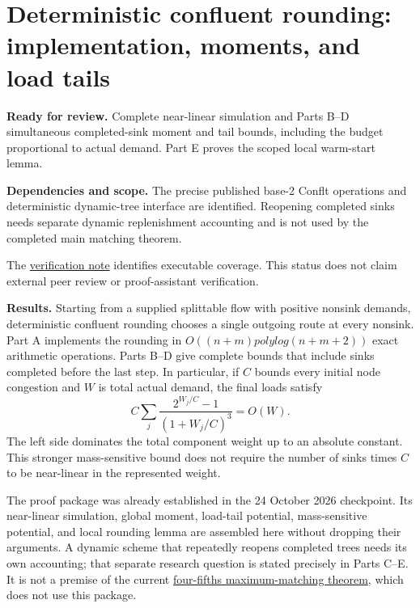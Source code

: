 
\hypertarget{af-385fd70686-deterministic-confluent-rounding-implementation-moments-and-load-tails}{%
\section{Deterministic confluent rounding: implementation, moments, and load tails}\label{af-385fd70686-deterministic-confluent-rounding-implementation-moments-and-load-tails}}

\textbf{Ready for review.} Complete near-linear simulation and Parts B--D simultaneous completed-sink moment and tail bounds, including the budget proportional to actual demand. Part E proves the scoped local warm-start lemma.

\textbf{Dependencies and scope.} The precise published base-2 Conflt operations and deterministic dynamic-tree interface are identified. Reopening completed sinks needs separate dynamic replenishment accounting and is not used by the completed main matching theorem.

The \href{https://github.com/icekylinx/algorithm-frontier/blob/main/manuscripts/graph-backends/verify/README.md}{verification note} identifies executable coverage. This status does not claim external peer review or proof-assistant verification.

\textbf{Results.} Starting from a supplied splittable flow with positive nonsink demands, deterministic confluent rounding chooses a single outgoing route at every nonsink. Part A implements the rounding in \(O((n+m) polylog(n+m+2))\) exact arithmetic operations. Parts B--D give complete bounds that include sinks completed before the last step. In particular, if \(C\) bounds every initial node congestion and \(W\) is total actual demand, the final loads satisfy \[
C\sum_j\frac{2^{W_j/C}-1}{(1+W_j/C)^3}=O(W).
\] The left side dominates the total component weight up to an absolute constant. This stronger mass-sensitive bound does not require the number of sinks times \(C\) to be near-linear in the represented weight.

The proof package was already established in the 24 October 2026 checkpoint. Its near-linear simulation, global moment, load-tail potential, mass-sensitive potential, and local rounding lemma are assembled here without dropping their arguments. A dynamic scheme that repeatedly reopens completed trees needs its own accounting; that separate research question is stated precisely in Parts C--E. It is not a premise of the current \href{https://github.com/icekylinx/algorithm-frontier/blob/main/problems/general-matching/proof.md}{four-fifths maximum-matching theorem}, which does not use this package.

